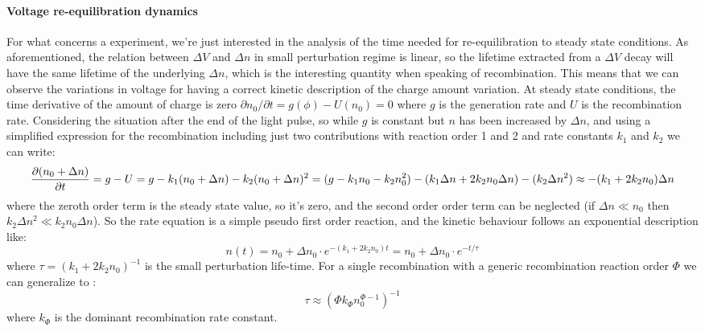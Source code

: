 	\paragraph{Voltage re-equilibration dynamics}
	For what concerns a  experiment, we're just interested in the analysis of the time needed for re-equilibration to steady state conditions.
	As aforementioned, the relation between $\Delta V$ and $\Delta n$ in small perturbation regime is linear, so the lifetime extracted from a $\Delta V$ decay will have the same lifetime of the underlying $\Delta n$, which is the interesting quantity when speaking of recombination.
	This means that we can observe the variations in voltage for having a correct kinetic description of the charge amount variation.
	At steady state conditions, the time derivative of the amount of charge is zero $\partial n_0 / \partial t = g(\phi) - U(n_0) = 0$ where $g$ is the generation rate and $U$ is the recombination rate.
	Considering the situation after the end of the light pulse, so while $g$ is constant but $n$ has been increased by $\Delta n$, and using a simplified expression for the recombination including just two contributions with reaction order 1 and 2 and rate constants $k_1$ and $k_2$ we can write:
	\begin{dmath}
		\pdv{(n_0 + \Delta n)}{t} = g - U = g - k_1(n_0 + \Delta n) - k_2(n_0 + \Delta n)^2 = (g - k_1 n_0 - k_2 n_0^2) - (k_1 \Delta n + 2 k_2 n_0 \Delta n) - (k_2 \Delta n ^2) \approx - (k_1 + 2 k_2 n_0 ) \Delta n
	\end{dmath}
	where the zeroth order term is the steady state value, so it's zero, and the second order order term can be neglected (if $\Delta n \ll n_0$ then $k_2 \Delta n^2 \ll k_2 n_0 \Delta n$).
	So the rate equation is a simple pseudo first order reaction, and the kinetic behaviour follows an exponential description like:
	\begin{equation}\label{eq:tpv_monoexp}
		n (t) = n_0 + \Delta n_0 \cdot e^{-(k_1 + 2 k_2 n_0) t} = n_0 + \Delta n_0 \cdot e^{-t / \tau}
	\end{equation}
	where $\tau = (k_1 + 2 k_2 n_0)^{-1}$ is the small perturbation life-time.
	For a single recombination with a generic recombination reaction order $\Phi$ we can generalize to \cite{Shuttle2008}:
	\begin{equation}\label{eq:tpv_tau_order}
		\tau \approx (\Phi k_\Phi n_0^{\Phi-1})^{-1}
	\end{equation}
	where $k_\Phi$ is the dominant recombination rate constant.
	
